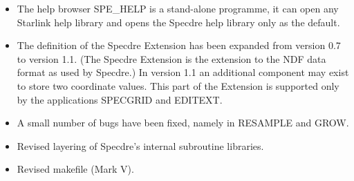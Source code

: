 \begin{itemize}
\item The help  browser SPE\_HELP is a  stand-alone programme, it can  open any
    Starlink help library  and opens  the Specdre help  library  only as the
    default.

\item The  definition of the Specdre Extension  has been expanded from version
    0.7 to  version 1.1. (The Specdre Extension  is the extension to the NDF
    data format as used by Specdre.)  In version 1.1 an additional component
    may exist to store two coordinate values. This part  of the Extension is
    supported only by the applications SPECGRID and EDITEXT.

\item A small number of bugs have been fixed, namely in RESAMPLE and GROW.

\item Revised layering of Specdre's internal subroutine libraries.

\item Revised makefile (Mark V).
\end{itemize}


